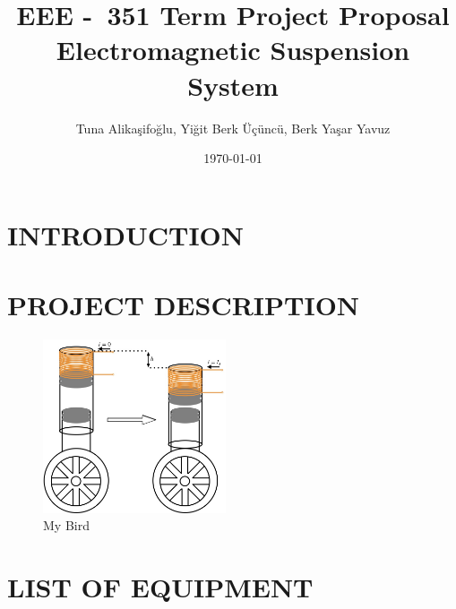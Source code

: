 \documentclass[a4paper, 11pt]{IEEEtran}
\title{EEE -\ 351 Term Project Proposal \\ Electromagnetic Suspension System}
\author{Tuna Alikaşifoğlu, Yiğit Berk Üçüncü, Berk Yaşar Yavuz}
\date{\today}
\begin{document}
\maketitle

\section{INTRODUCTION}
\section{PROJECT DESCRIPTION}
\begin{figure}[h]
    \centering
    \includegraphics[width=0.48\textwidth, height=0.3\textheight, keepaspectratio]{suspension.jpeg}
    \caption{My Bird}\label{fig:suspension}
\end{figure}
\section{LIST OF EQUIPMENT~\autocite{emt}}

\printbibliography{}
\end{document}
